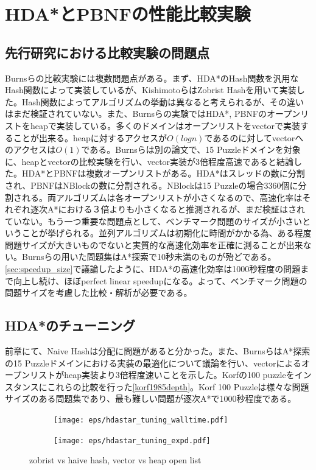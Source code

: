 \documentclass{jsarticle}
\begin{document}
\section{HDA*とPBNFの性能比較実験}
\label{ch:analysis2}

\subsection{先行研究における比較実験の問題点}

Burnsらの比較実験には複数問題点がある\cite{Burns2010}。まず、HDA*のHash関数を汎用なHash関数によって実装しているが、KishimotoらはZobrist Hashを用いて実装した。Hash関数によってアルゴリズムの挙動は異なると考えられるが、その違いはまだ検証されていない。また、Burnsらの実験ではHDA*, PBNFのオープンリストをheapで実装している。多くのドメインはオープンリストをvectorで実装することが出来る。heapに対するアクセスが$O(logn)$であるのに対してvectorへのアクセスは$O(1)$である。Burnsらは別の論文で、15 Puzzleドメインを対象に、heapとvectorの比較実験を行い、vector実装が3倍程度高速であると結論した\cite{burns2012implementing}。HDA*とPBNFは複数オープンリストがある。HDA*はスレッドの数に分割され、PBNFはNBlockの数に分割される。NBlockは15 Puzzleの場合3360個に分割される。両アルゴリズムは各オープンリストが小さくなるので、高速化率はそれぞれ逐次A*における３倍よりも小さくなると推測されるが、まだ検証はされていない。もう一つ重要な問題点として、ベンチマーク問題のサイズが小さいということが挙げられる。並列アルゴリズムは初期化に時間がかかる為、ある程度問題サイズが大きいものでないと実質的な高速化効率を正確に測ることが出来ない。Burnsらの用いた問題集はA*探索で10秒未満のものが殆どである。\ref{sec:speedup_size}で議論したように、HDA*の高速化効率は1000秒程度の問題まで向上し続け、ほぼperfect linear speedupになる。よって、ベンチマーク問題の問題サイズを考慮した比較・解析が必要である。

\subsection{HDA*のチューニング}
\label{sec:hdastar_tuning}

前章にて、Naive Hashは分配に問題があると分かった。また、BurnsらはA*探索の15 Puzzleドメインにおける実装の最適化について議論を行い、vectorによるオープンリストがheap実装より3倍程度速いことを示した\cite{burns2012implementing}。Korfの100 puzzleをインスタンスにこれらの比較を行った\ref{korf1985depth}。Korf 100 Puzzleは様々な問題サイズのある問題集であり、最も難しい問題が逐次A*で1000秒程度である。

\begin{figure}
	\centering
	\begin{subfigure}{0.6\columnwidth}
		\texttt{[image: eps/hdastar\_tuning\_walltime.pdf]}
		\label{fig:hdastar_tuning_walltime}
	\end{subfigure}
	\begin{subfigure}{0.6\columnwidth}
		\texttt{[image: eps/hdastar\_tuning\_expd.pdf]}
		\label{fig:hdastar_tuning_expd}
	\end{subfigure}
	\label{fig:hdastar_tuning}
	\caption{zobrist vs haive hash, vector vs heap open list}
\end{figure}
\end{document}
